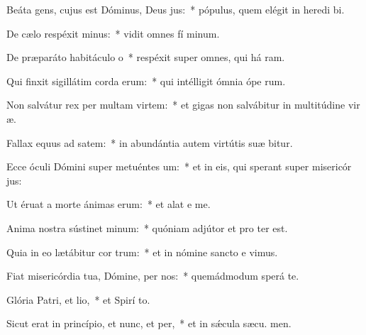 \item Beáta gens, cujus est Dóminus, Deus jus:~* pópulus, quem elégit in heredi bi.
\item De cælo respéxit minus:~* vidit omnes fí minum.
\item De præparáto habitáculo o~* respéxit super omnes, qui há ram.
\item Qui finxit sigillátim corda erum:~* qui intélligit ómnia ópe rum.
\item Non salvátur rex per multam virtem:~* et gigas non salvábitur in multitúdine vir æ.
\item Fallax equus ad satem:~* in abundántia autem virtútis suæ  bitur.
\item Ecce óculi Dómini super metuéntes um:~* et in eis, qui sperant super misericór jus:
\item Ut éruat a morte ánimas erum:~* et alat e  me.
\item Anima nostra sústinet minum:~* quóniam adjútor et pro ter est.
\item Quia in eo lætábitur cor trum:~* et in nómine sancto e vimus.
\item Fiat misericórdia tua, Dómine, per nos:~* quemádmodum sperá  te.
\item Glória Patri, et lio,~* et Spirí to.
\item Sicut erat in princípio, et nunc, et per,~* et in sǽcula sæcu. men.
